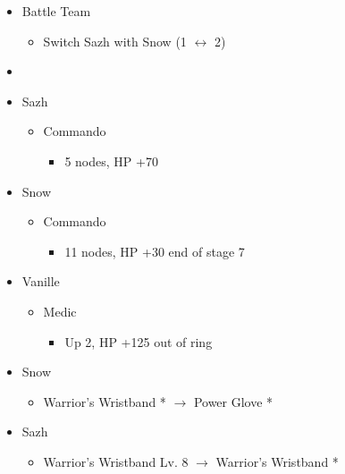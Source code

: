 \begin{menu}
\begin{itemize}
    \paradigm
    \begin{itemize}
        \item Battle Team
        \begin{itemize}
            \item Switch Sazh with Snow (1 $\leftrightarrow$ 2)
        \end{itemize}
        \item {}%
{\paradigmline{(\rav)}{\com}{\com}}%
{\paradigmline[2]{\textit{\com}}{\textit{\com}}{\textit{\com}}}%
{\paradigmline{(\rav)}{\sen}{(\rav)}}%
{\paradigmline{(\com)}{(\sen)}{\med}}%
{\paradigmline{\rav}{(\com)}{(\rav)}}%
{\paradigmline{\rav}{\rav}{\rav}}
    \end{itemize}
    \crystarium
    \begin{itemize}
        \item Sazh
        \begin{itemize}
            \item Commando
            \begin{itemize}
                \item 5 nodes, HP +70
            \end{itemize}
        \end{itemize}
        \item Snow
        \begin{itemize}
            \item Commando
            \begin{itemize}
                \item 11 nodes, HP +30 end of stage 7
            \end{itemize}
        \end{itemize}
        \item Vanille
        \begin{itemize}
            \item Medic
            \begin{itemize}
                \item Up 2, HP +125 out of ring
            \end{itemize}
        \end{itemize}
    \end{itemize}
    \equip
    \begin{itemize}
        \item Snow
        \begin{itemize}
            \item Warrior's Wristband * $\rightarrow$ Power Glove *
        \end{itemize}
        \item Sazh
        \begin{itemize}
            \item Warrior's Wristband Lv. 8 $\rightarrow$ Warrior's Wristband *
        \end{itemize}
    \end{itemize}
\end{itemize}
\end{menu}
